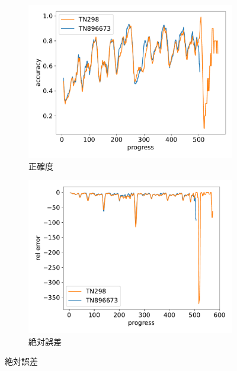 \begin{figure}[t]
\centering
\begin{subfigure}[b]{0.49\linewidth}
    \includegraphics[width=\linewidth]{pdf/compare/merged_NT5_OI1200_compare/accuracy.pdf}
    \caption{正確度}
    \label{fig:nt5_exp1_accuracy}
\end{subfigure}
\begin{subfigure}[b]{0.49\linewidth}
    \includegraphics[width=\linewidth]{pdf/compare/merged_NT5_OI1200_compare/error_abs.pdf}
    \caption{絶対誤差}
    \label{fig:nt5_exp1_error_abs}
\end{subfigure}

\end{figure}
